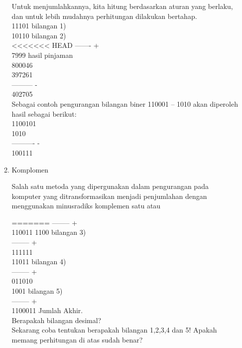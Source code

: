 \documentclass{article}
\begin{document}
\begin{enumerate}
\begin{enumerate}
Untuk menjumlahkannya, kita hitung berdasarkan aturan yang berlaku, dan untuk lebih mudahnya perhitungan dilakukan bertahap. \\
11101 bilangan 1) \\
10110 bilangan 2) \\
<<<<<<< HEAD
------- + \\
7999 \textrightarrow hasil pinjaman \\
800046 \\
397261 \\
--------- - \\
402705 \\
Sebagai contoh pengurangan bilangan biner 110001 – 1010 akan diperoleh hasil sebagai berikut: \\
1100101 \\
1010 \\
---------- - \\
100111 \\

\item Komplomen

Salah satu metoda yang dipergunakan dalam pengurangan pada komputer yang ditransformasikan menjadi penjumlahan dengan menggunakan minusradiks komplemen satu atau 

=======
-------- + \\
110011
1100 bilangan 3) \\
-------- + \\
111111 \\
11011 bilangan 4) \\ 
-------- + \\
011010 \\
1001 bilangan 5) \\ 
-------- + \\
1100011 \textrightarrow Jumlah Akhir. \\
Berapakah bilangan desimal? \\
Sekarang coba tentukan berapakah bilangan 1,2,3,4 dan 5! Apakah memang perhitungan di atas sudah benar? \\


\end{enumerate}
\end{enumerate}
\end{document}
